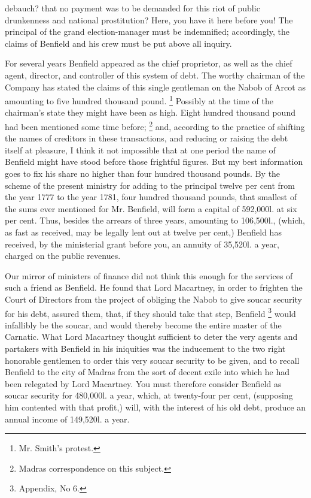debauch? that no payment was to be demanded for this riot of public drunkenness and national prostitution? Here, you have it here before you! The principal of the grand election-manager must be indemnified; accordingly, the claims of Benfield and his crew must be put above all inquiry.

For several years Benfield appeared as the chief proprietor, as well as the chief agent, director, and controller of this system of debt. The worthy chairman of the Company has stated the claims of this single gentleman on the Nabob of Arcot as amounting to five hundred thousand pound.
\footnote{ Mr. Smith's protest.}
 Possibly at the time of the chairman's state they might have been as high. Eight hundred thousand pound had been mentioned some time before;
\footnote{ Madras correspondence on this subject.}
 and, according to the practice of shifting the names of creditors in these transactions, and reducing or raising the debt itself at pleasure, I think it not impossible that at one period the name of Benfield might have stood before those frightful figures. But my best information goes to fix his share no higher than four hundred thousand pounds. By the scheme of the present ministry for adding to the principal twelve per cent from the year 1777 to the year 1781, four hundred thousand pounds, that smallest of the sums ever mentioned for Mr. Benfield, will form a capital of 592,000l. at six per cent. Thus, besides the arrears of three years, amounting to 106,500l., (which, as fast as received, may be legally lent out at twelve per cent,) Benfield has received, by the ministerial grant before you, an annuity of 35,520l. a year, charged on the public revenues.

Our mirror of ministers of finance did not think this enough for the services of such a friend as Benfield. He found that Lord Macartney, in order to frighten the Court of Directors from the project of obliging the Nabob to give soucar security for his debt, assured them, that, if they should take that step, Benfield
\footnote{ Appendix, No 6.}
 would infallibly be the soucar, and would thereby become the entire master of the Carnatic. What Lord Macartney thought sufficient to deter the very agents and partakers with Benfield in his iniquities was the inducement to the two right honorable gentlemen to order this very soucar security to be given, and to recall Benfield to the city of Madras from the sort of decent exile into which he had been relegated by Lord Macartney. You must therefore consider Benfield as soucar security for 480,000l. a year, which, at twenty-four per cent, (supposing him contented with that profit,) will, with the interest of his old debt, produce an annual income of 149,520l. a year.

